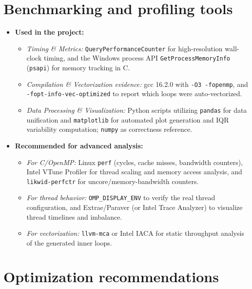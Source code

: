 \documentclass[12pt,a4paper]{article}
\begin{document}
\section{Benchmarking and profiling tools}
\label{sec:tools}

\begin{itemize}
\item \textbf{Used in the project:}
\begin{itemize}
\item \textit{Timing \& Metrics:} \texttt{QueryPerformanceCounter} for
high-resolution wall-clock timing, and the Windows process API
\texttt{GetProcessMemoryInfo} (\texttt{psapi}) for memory tracking in C.
\item \textit{Compilation \& Vectorization evidence:} gcc 16.2.0 with
\texttt{-O3 -fopenmp}, and \texttt{-fopt-info-vec-optimized} to report which
loops were auto-vectorized.
\item \textit{Data Processing \& Visualization:} Python scripts utilizing
\texttt{pandas} for data unification and \texttt{matplotlib} for automated
plot generation and IQR variability computation; \texttt{numpy} as
correctness reference.
\end{itemize}
\item \textbf{Recommended for advanced analysis:}
\begin{itemize}
\item \textit{For C/OpenMP:} Linux \texttt{perf} (cycles, cache misses,
bandwidth counters), Intel VTune Profiler for thread scaling and memory
access analysis, and \texttt{likwid-perfctr} for uncore/memory-bandwidth
counters.
\item \textit{For thread behavior:} \texttt{OMP\_DISPLAY\_ENV} to verify
the real thread configuration, and Extrae/Paraver (or Intel Trace Analyzer)
to visualize thread timelines and imbalance.
\item \textit{For vectorization:} \texttt{llvm-mca} or Intel IACA for
static throughput analysis of the generated inner loops.
\end{itemize}
\end{itemize}

\section{Optimization recommendations}
\label{sec:opt}
\end{document}
